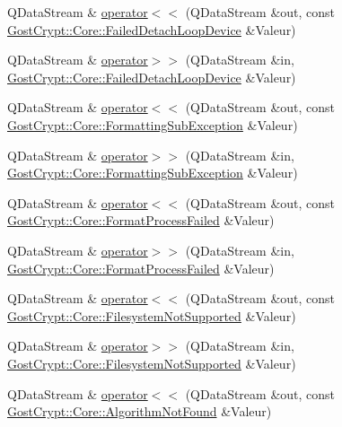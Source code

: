 \begin{DoxyCompactItemize}
Q\+Data\+Stream \& \hyperlink{namespace_gost_crypt_1_1_core_a8b3b0845322530474cb031d3a8cf1df2}{operator$<$$<$} (Q\+Data\+Stream \&out, const \hyperlink{class_gost_crypt_1_1_core_1_1_failed_detach_loop_device}{Gost\+Crypt\+::\+Core\+::\+Failed\+Detach\+Loop\+Device} \&Valeur)
\item 
Q\+Data\+Stream \& \hyperlink{namespace_gost_crypt_1_1_core_af919152c08eeea79b59f2628649cf266}{operator$>$$>$} (Q\+Data\+Stream \&in, \hyperlink{class_gost_crypt_1_1_core_1_1_failed_detach_loop_device}{Gost\+Crypt\+::\+Core\+::\+Failed\+Detach\+Loop\+Device} \&Valeur)
\item 
Q\+Data\+Stream \& \hyperlink{namespace_gost_crypt_1_1_core_af50154c27c4dd88f7d66319d7897db4b}{operator$<$$<$} (Q\+Data\+Stream \&out, const \hyperlink{class_gost_crypt_1_1_core_1_1_formatting_sub_exception}{Gost\+Crypt\+::\+Core\+::\+Formatting\+Sub\+Exception} \&Valeur)
\item 
Q\+Data\+Stream \& \hyperlink{namespace_gost_crypt_1_1_core_ac7e607328dbff6ca8309771c99d4df4d}{operator$>$$>$} (Q\+Data\+Stream \&in, \hyperlink{class_gost_crypt_1_1_core_1_1_formatting_sub_exception}{Gost\+Crypt\+::\+Core\+::\+Formatting\+Sub\+Exception} \&Valeur)
\item 
Q\+Data\+Stream \& \hyperlink{namespace_gost_crypt_1_1_core_a05f0e1b0d760173d42fee455b4377d28}{operator$<$$<$} (Q\+Data\+Stream \&out, const \hyperlink{class_gost_crypt_1_1_core_1_1_format_process_failed}{Gost\+Crypt\+::\+Core\+::\+Format\+Process\+Failed} \&Valeur)
\item 
Q\+Data\+Stream \& \hyperlink{namespace_gost_crypt_1_1_core_a3dc335b2a1a26787ce48830a40944537}{operator$>$$>$} (Q\+Data\+Stream \&in, \hyperlink{class_gost_crypt_1_1_core_1_1_format_process_failed}{Gost\+Crypt\+::\+Core\+::\+Format\+Process\+Failed} \&Valeur)
\item 
Q\+Data\+Stream \& \hyperlink{namespace_gost_crypt_1_1_core_afaa600a239b99669879ddcd5d7818887}{operator$<$$<$} (Q\+Data\+Stream \&out, const \hyperlink{class_gost_crypt_1_1_core_1_1_filesystem_not_supported}{Gost\+Crypt\+::\+Core\+::\+Filesystem\+Not\+Supported} \&Valeur)
\item 
Q\+Data\+Stream \& \hyperlink{namespace_gost_crypt_1_1_core_a83c08e835eda33ba886802a41c5c02ec}{operator$>$$>$} (Q\+Data\+Stream \&in, \hyperlink{class_gost_crypt_1_1_core_1_1_filesystem_not_supported}{Gost\+Crypt\+::\+Core\+::\+Filesystem\+Not\+Supported} \&Valeur)
\item 
Q\+Data\+Stream \& \hyperlink{namespace_gost_crypt_1_1_core_a87a209dcc070f276649e361fec6b80a3}{operator$<$$<$} (Q\+Data\+Stream \&out, const \hyperlink{class_gost_crypt_1_1_core_1_1_algorithm_not_found}{Gost\+Crypt\+::\+Core\+::\+Algorithm\+Not\+Found} \&Valeur)

\end{DoxyCompactItemize}

